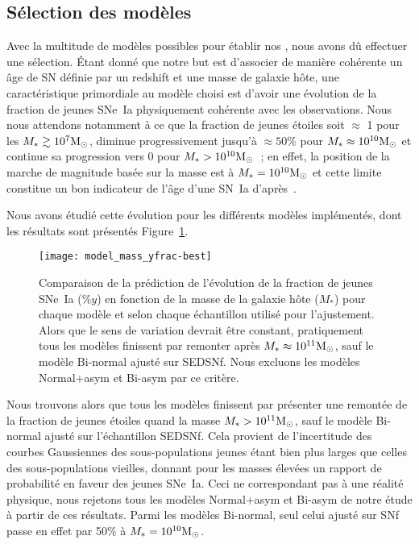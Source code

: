 \documentclass[../main/main.tex]{subfiles}
\begin{document}
\subsection{Sélection des modèles}\label{ssec:mmodsel}

Avec la multitude de modèles possibles pour établir nos \hostlib, nous avons dû
effectuer une sélection. Étant donné que notre but est d'associer de manière
cohérente un âge de SN définie par un redshift et une masse de galaxie hôte, une
caractéristique primordiale au modèle choisi est d'avoir une évolution de la
fraction de jeunes SNe~Ia physiquement cohérente avec les observations. Nous
nous attendons notamment à ce que la fraction de jeunes étoiles soit $\approx$ 1
pour les $M_* \gtrsim 10^7\si{\Msun}$, diminue progressivement jusqu'à $\approx
50\%$ pour $M_* \approx 10^{10}\si{\Msun}$ et continue sa progression vers 0
pour $M_* > 10^{10}\si{\Msun}$~; en effet, la position de la marche de magnitude
basée sur la masse est à $M_* = 10^{10}\si{\Msun}$ et cette limite constitue un
bon indicateur de l'âge d'une SN~Ia d'après~\cite{briday2022}.

Nous avons étudié cette évolution pour les différents modèles implémentés, dont
les résultats sont présentés Figure~\ref{fig:ypc}.

\begin{figure}[ht]
    \centerfloat
    \texttt{[image: model\_mass\_yfrac-best]}
    \caption[Comparaison de la prédiction de l'évolution de la fraction de
    jeunes SNe~Ia en fonction de la masse de la galaxie hôte]{Comparaison de la
        prédiction de l'évolution de la fraction de jeunes SNe~Ia ($\%y$) en
        fonction de la masse de la galaxie hôte ($M_*$) pour chaque modèle et
        selon chaque échantillon utilisé pour l'ajustement. Alors que le sens de
        variation devrait être constant, pratiquement tous les modèles finissent
        par remonter après $M_* \approx 10^{11}\si{\Msun}$, sauf le modèle
        Bi-normal ajusté sur SEDSNf. Nous excluons les modèles Normal+asym et
    Bi-asym par ce critère.}
    \label{fig:ypc}
\end{figure}

Nous trouvons alors que tous les modèles finissent par présenter une remontée de
la fraction de jeunes étoiles quand la masse $M_* > 10^{11}\si{\Msun}$, sauf le
modèle Bi-normal ajusté sur l'échantillon SEDSNf. Cela provient de l'incertitude
des courbes Gaussiennes des sous-populations jeunes étant bien plus larges que
celles des sous-populations vieilles, donnant pour les masses élevées un rapport
de probabilité en faveur des jeunes SNe~Ia. Ceci ne correspondant pas à une
réalité physique, nous rejetons tous les modèles Normal+asym et Bi-asym de
notre étude à partir de ces résultats. Parmi les modèles Bi-normal, seul celui
ajusté sur SNf passe en effet par 50\% à $M_*=10^{10}\si{\Msun}$.
\end{document}
